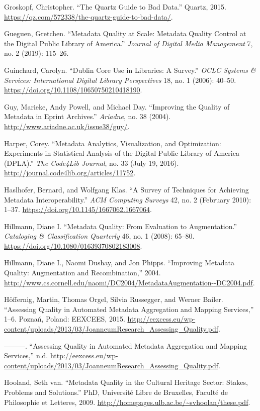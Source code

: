 Groskopf, Christopher. “The Quartz Guide to Bad Data.” Quartz, 2015. \url{https://qz.com/572338/the-quartz-guide-to-bad-data/}.

Gueguen, Gretchen. “Metadata Quality at Scale: Metadata Quality Control at the Digital Public Library of America.” \emph{Journal of Digital Media Management} 7, no. 2 (2019): 115–26.

Guinchard, Carolyn. “Dublin Core Use in Libraries: A Survey.” \emph{OCLC Systems \& Services: International Digital Library Perspectives} 18, no. 1 (2006): 40–50. \url{https://doi.org/10.1108/10650750210418190}.

Guy, Marieke, Andy Powell, and Michael Day. “Improving the Quality of Metadata in Eprint Archives.” \emph{Ariadne}, no. 38 (2004). \url{http://www.ariadne.ac.uk/issue38/guy/}.

Harper, Corey. “Metadata Analytics, Visualization, and Optimization: Experiments in Statistical Analysis of the Digital Public Library of America (DPLA).” \emph{The Code4Lib Journal}, no. 33 (July 19, 2016). \url{http://journal.code4lib.org/articles/11752}.

Haslhofer, Bernard, and Wolfgang Klas. “A Survey of Techniques for Achieving Metadata Interoperability.” \emph{ACM Computing Surveys} 42, no. 2 (February 2010): 1–37. \url{https://doi.org/10.1145/1667062.1667064}.

Hillmann, Diane I. “Metadata Quality: From Evaluation to Augmentation.” \emph{Cataloging \& Classification Quarterly} 46, no. 1 (2008): 65–80. \url{https://doi.org/10.1080/01639370802183008}.

Hillmann, Diane I., Naomi Dushay, and Jon Phipps. “Improving Metadata Quality: Augmentation and Recombination,” 2004. \url{http://www.cs.cornell.edu/naomi/DC2004/MetadataAugmentation--DC2004.pdf}.

Höffernig, Martin, Thomas Orgel, Silvia Russegger, and Werner Bailer. “Assessing Quality in Automated Metadata Aggregation and Mapping Services,” 1–6. Poznań, Poland: EEXCEES, 2015. \url{http://eexcess.eu/wp-content/uploads/2013/03/JoanneumResearch_Assessing_Quality.pdf}.

———. “Assessing Quality in Automated Metadata Aggregation and Mapping Services,” n.d. \url{http://eexcess.eu/wp-content/uploads/2013/03/JoanneumResearch_Assessing_Quality.pdf}.

Hooland, Seth van. “Metadata Quality in the Cultural Heritage Sector: Stakes, Problems and Solutions.” PhD, Université Libre de Bruxelles, Faculté de Philosophie et Letteres, 2009. \url{http://homepages.ulb.ac.be/~svhoolan/these.pdf}.

